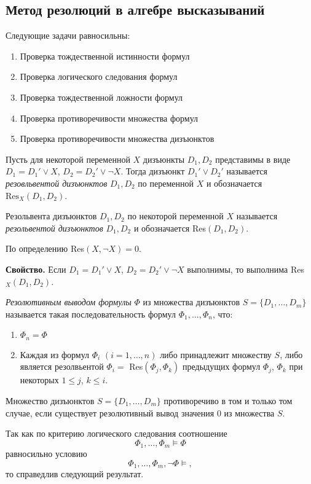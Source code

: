 \subsection*{Метод резолюций в алгебре высказываний}
Следующие задачи равносильны:
\begin{enumerate}
    \item Проверка тождественной истинности формул
    \item Проверка логического следования формул
    \item Проверка тождественной ложности формул
    \item Проверка противоречивости множества формул
    \item Проверка противоречивости множества дизъюнктов
\end{enumerate}

\begin{definition}
    Пусть для некоторой переменной $X$ дизъюнкты $D_1, D_2$ представимы в виде $D_1=D_1'\lor X$, $D_2=D_2'\lor\lnot X$. Тогда дизъюнкт $D_1'\lor D_2'$ называется \textit{резовльвентой дизъюнктов} $D_1,D_2$ по переменной $X$ и обозначается $\text{Res}_X(D_1,D_2)$.

    Резольвента дизъюнктов $D_1,D_2$ по некоторой переменной $X$ называется \textit{резольвентой дизъюнктов} $D_1,D_2$ и обозначается Res$(D_1,D_2)$. 
    
    По определению Res$(X,\lnot X) = 0$.
\end{definition}

\textbf{Свойство.} Если $D_1=D_1'\lor X$, $D_2=D_2'\lor\lnot X$ выполнимы, то выполнима Res$_X(D_1,D_2)$.

\begin{definition}
    \textit{Резолютивным выводом формулы} $\Phi$ из множества дизъюнктов $S=\{D_1,\ldots,D_m\}$ называется такая последовательность формул $\Phi_1,\ldots,\Phi_n$, что:
    \begin{enumerate}
        \item $\Phi_n = \Phi$
        \item Каждая из формул $\Phi_i$ $(i=1,\ldots,n)$ либо принадлежит множеству $S$, либо является резолвьентой $\Phi_i=$ Res$(\Phi_j,\Phi_k)$ предыдущих формул $\Phi_j$, $\Phi_k$ при некоторых $1\leq j$, $k\leq i$.
    \end{enumerate}
\end{definition}

\begin{theorem}
    Множество дизъюнктов $S = \{D_1,\ldots,D_m\}$ противоречиво в том и только том случае, если существует резолютивный вывод значения 0 из множества $S$.
    
    Так как по критерию логического следования соотношение 
    $$\Phi_1,\ldots,\Phi_m\models \Phi$$ равносильно условию $$\Phi_1,\ldots,\Phi_m,\lnot\Phi\models,$$ то справедлив следующий результат.
\end{theorem}

